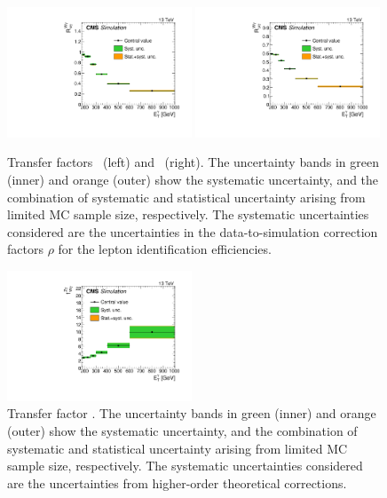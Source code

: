 \begin{figure}[htbp]
  \centering
    \includegraphics[width=0.49\textwidth]{Analysis/Figures/RWe.pdf}
    \includegraphics[width=0.49\textwidth]{Analysis/Figures/RWm.pdf}
    \caption{
      Transfer factors \RWe\ (left) and \RWm\ (right). 
      The uncertainty bands in green (inner) and orange (outer) show the systematic uncertainty, and the combination of systematic and statistical uncertainty arising from limited MC sample size, respectively. 
      The systematic uncertainties considered are the uncertainties in the data-to-simulation correction factors $\rho$ for the lepton identification efficiencies.
    }
    \label{fig:tf_w}
\end{figure}

\begin{figure}[htbp]
  \centering
    \includegraphics[width=0.49\textwidth]{Analysis/Figures/fZW.pdf}
    \caption{
      Transfer factor \fZW. 
      The uncertainty bands in green (inner) and orange (outer) show the systematic uncertainty, and the combination of systematic and statistical uncertainty arising from limited MC sample size, respectively. 
      The systematic uncertainties considered are the uncertainties from higher-order theoretical corrections.
    }
    \label{fig:tf_wz}
\end{figure}

